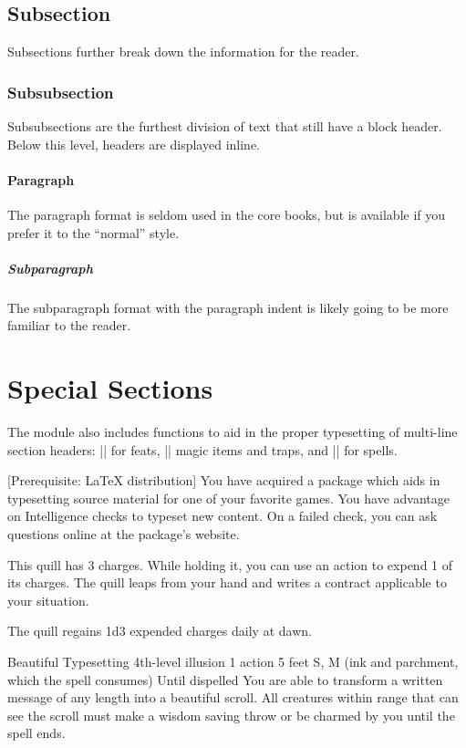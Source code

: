 \documentclass[10pt,twocolumn,twoside,openany,bg=full,layout=true,nomultitoc]{dndbook}
\begin{document}
\subsection{Subsection}
Subsections further break down the information for the reader.

\subsubsection{Subsubsection}
Subsubsections are the furthest division of text that still have a block header. Below this level, headers are displayed inline.

\paragraph{Paragraph}
The paragraph format is seldom used in the core books, but is available if you prefer it to the ``normal'' style.

\subparagraph{Subparagraph}
The subparagraph format with the paragraph indent is likely going to be more familiar to the reader.

\section{Special Sections}
The module also includes functions to aid in the proper typesetting of multi-line section headers: |\DndFeatHeader| for feats, |\DndItemHeader| magic items and traps, and |\DndSpellHeader| for spells.

[Prerequisite: \LaTeX{} distribution]
You have acquired a package which aids in typesetting source material for one of your favorite games. You have advantage on Intelligence checks to typeset new content. On a failed check, you can ask questions online at the package's website.

This quill has 3 charges. While holding it, you can use an action to expend 1 of its charges. The quill leaps from your hand and writes a contract applicable to your situation.

The quill regains 1d3 expended charges daily at dawn.

\DndSpellHeader%
  {Beautiful Typesetting}
  {4th-level illusion}
  {1 action}
  {5 feet}
  {S, M (ink and parchment, which the spell consumes)}
  {Until dispelled}
You are able to transform a written message of any length into a beautiful scroll. All creatures within range that can see the scroll must make a wisdom saving throw or be charmed by you until the spell ends.
\end{document}
